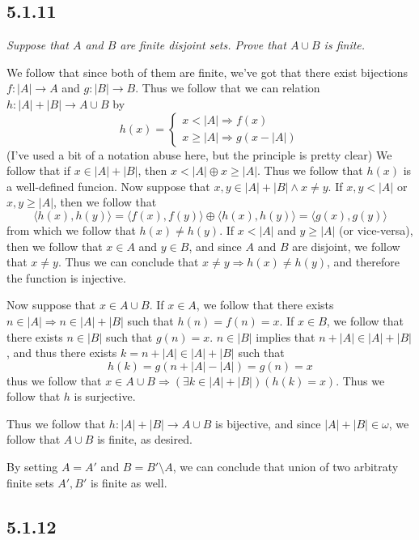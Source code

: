 \documentclass[11pt,oneside,titlepage]{book}
\DeclareMathOperator \ra {\Rightarrow}
\newcommand{\eangle}[1]{\langle #1 \rangle}
\begin{document}
\subsection*{5.1.11}

\textit{Suppose that $A$ and $B$ are finite disjoint sets. Prove that $A \cup B$ is finite.}

We follow that since both of them are finite, we've got that there exist bijections
$f: |A| \to A$ and $g: |B| \to B$. Thus we follow that we can relation $h : |A| + |B| \to A \cup B$
by
$$h(x) = 
\begin{cases}
  x < |A| \ra f(x) \\
  x \geq |A| \ra g(x - |A|)
\end{cases}
$$
(I've used a bit of a notation abuse here, but the principle is pretty clear)
We follow that if $x \in |A| + |B|$, then $x < |A| \oplus x \geq |A|$. Thus we follow that
$h(x)$ is a well-defined funcion. Now suppose that $x, y \in |A| + |B| \land x \neq y$.
If $x, y < |A|$ or $x, y \geq |A|$, then we follow that
$$\eangle{h(x), h(y)} = \eangle{f(x), f(y)} \oplus  \eangle{h(x), h(y)} = \eangle{g(x), g(y)}$$
from which we follow that $h(x) \neq h(y)$. If $x < |A|$ and $y \geq |A|$ (or vice-versa),
then we follow that $x \in A$ and $y \in B$, and since $A$ and $B$ are disjoint,
we follow that $x \neq y$.
Thus we can conclude that $x \neq y \ra h(x) \neq h(y)$, and therefore the function is injective.

Now suppose that $x \in A \cup B$. If $x \in A$, we follow that there exists
$n \in |A| \ra n \in |A| + |B|$ such
that $h(n) = f(n) = x$.
If $x \in B$, we follow that there exists $n \in |B|$ such that $g(n) = x$.
$n \in |B|$ implies that $n + |A| \in |A| + |B|$, and thus there exists
$k = n + |A| \in |A| + |B|$ such that
$$h(k) = g(n + |A| - |A|) = g(n) = x$$
thus we follow that $x \in A \cup B \ra (\exists k \in |A| + |B|)(h(k) = x)$. Thus we follow that
$h$ is surjective.

Thus we follow that $h: |A| + |B| \to A \cup B$ is bijective, and since $|A| + |B| \in \omega$,
we follow that $A \cup B$ is finite, as desired.

By setting $A = A'$ and $B = B' \setminus A$, we can conclude that union of two arbitraty
finite sets $A', B'$ is finite as well.

\subsection*{5.1.12 }
\end{document}
